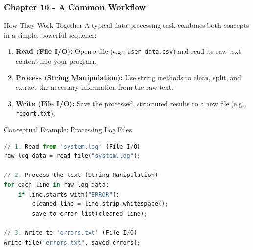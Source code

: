 \documentclass{beamer}
\begin{document}
\begin{frame}[fragile]
    \frametitle{Chapter 10 - A Common Workflow}
    
    \begin{block}{How They Work Together}
    A typical data processing task combines both concepts in a simple, powerful sequence:
    \end{block}

    \begin{enumerate}
        \item \textbf{Read (File I/O):} Open a file (e.g., \texttt{user\_data.csv}) and read its raw text content into your program.
        \item \textbf{Process (String Manipulation):} Use string methods to clean, split, and extract the necessary information from the raw text.
        \item \textbf{Write (File I/O):} Save the processed, structured results to a new file (e.g., \texttt{report.txt}).
    \end{enumerate}

    \vspace{1em}
    
    \begin{exampleblock}{Conceptual Example: Processing Log Files}
\begin{lstlisting}[language=Python, basicstyle=\small\ttfamily, keywordstyle=\color{blue}]
// 1. Read from 'system.log' (File I/O)
raw_log_data = read_file("system.log"); 

// 2. Process the text (String Manipulation)
for each line in raw_log_data:
    if line.starts_with("ERROR"):
        cleaned_line = line.strip_whitespace();
        save_to_error_list(cleaned_line);

// 3. Write to 'errors.txt' (File I/O)
write_file("errors.txt", saved_errors);
\end{lstlisting}
    \end{exampleblock}
    
\end{frame}
\end{document}
